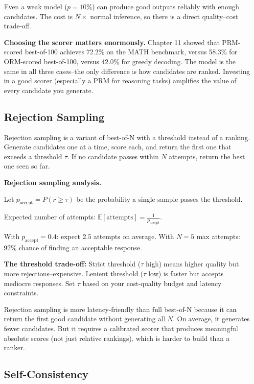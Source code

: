 \begin{chapterenv}
\begin{infobox}
Even a weak model ($p = 10\%$) can produce good outputs reliably with enough candidates. The cost is $N \times$ normal inference, so there is a direct quality--cost trade-off.
\end{infobox}

\textbf{Choosing the scorer matters enormously.} Chapter 11 showed that PRM-scored best-of-100 achieves 72.2\% on the MATH benchmark, versus 58.3\% for ORM-scored best-of-100, versus 42.0\% for greedy decoding. The model is the same in all three cases--the only difference is how candidates are ranked. Investing in a good scorer (especially a PRM for reasoning tasks) amplifies the value of every candidate you generate.

\subsection{Rejection Sampling}

Rejection sampling is a variant of best-of-N with a threshold instead of a ranking. Generate candidates one at a time, score each, and return the first one that exceeds a threshold $\tau$. If no candidate passes within $N$ attempts, return the best one seen so far.

\begin{infobox}
\textbf{Rejection sampling analysis.}

Let $p_{\text{accept}} = P(r \geq \tau)$ be the probability a single sample passes the threshold.

Expected number of attempts: $\mathbb{E}[\text{attempts}] = \frac{1}{p_{\text{accept}}}$.

With $p_{\text{accept}} = 0.4$: expect 2.5 attempts on average. With $N = 5$ max attempts: 92\% chance of finding an acceptable response.

\textbf{The threshold trade-off:} Strict threshold ($\tau$ high) means higher quality but more rejections--expensive. Lenient threshold ($\tau$ low) is faster but accepts mediocre responses. Set $\tau$ based on your cost-quality budget and latency constraints.
\end{infobox}

Rejection sampling is more latency-friendly than full best-of-N because it can return the first good candidate without generating all $N$. On average, it generates fewer candidates. But it requires a calibrated scorer that produces meaningful absolute scores (not just relative rankings), which is harder to build than a ranker.

\subsection{Self-Consistency}


\end{chapterenv}
